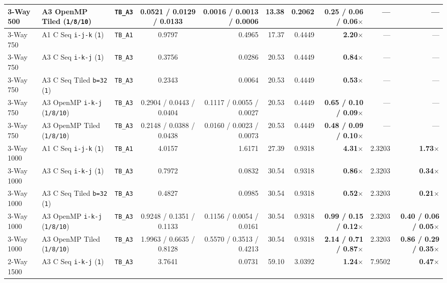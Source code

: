 \documentclass[11pt,a4paper]{article}
\begin{document}
\begin{table}[!htbp]
{\begin{tabular}{lllcrrrrrr}
3-Way 500  & A3 OpenMP Tiled (\texttt{1/8/10}) & \texttt{TB\_A3} & 0.0521 / 0.0129 / 0.0133 & 0.0016 / 0.0013 / 0.0006 & 13.38 & 0.2062 & \textbf{0.25 / 0.06 / 0.06$\times$} & --- & --- \\
\midrule
3-Way 750  & A1 C Seq \texttt{i-j-k} (\texttt{1}) & \texttt{TB\_A1} & 0.9797 & 0.4965 & 17.37 & 0.4449 & \textbf{2.20$\times$} & --- & --- \\
3-Way 750  & A3 C Seq \texttt{i-k-j} (\texttt{1}) & \texttt{TB\_A3} & 0.3756 & 0.0286 & 20.53 & 0.4449 & \textbf{0.84$\times$} & --- & --- \\
3-Way 750  & A3 C Seq Tiled \texttt{b=32} (\texttt{1}) & \texttt{TB\_A3} & 0.2343 & 0.0064 & 20.53 & 0.4449 & \textbf{0.53$\times$} & --- & --- \\
3-Way 750  & A3 OpenMP \texttt{i-k-j} (\texttt{1/8/10}) & \texttt{TB\_A3} & 0.2904 / 0.0443 / 0.0404 & 0.1117 / 0.0055 / 0.0027 & 20.53 & 0.4449 & \textbf{0.65 / 0.10 / 0.09$\times$} & --- & --- \\
3-Way 750  & A3 OpenMP Tiled (\texttt{1/8/10}) & \texttt{TB\_A3} & 0.2148 / 0.0388 / 0.0438 & 0.0160 / 0.0023 / 0.0073 & 20.53 & 0.4449 & \textbf{0.48 / 0.09 / 0.10$\times$} & --- & --- \\
\midrule
3-Way 1000 & A1 C Seq \texttt{i-j-k} (\texttt{1}) & \texttt{TB\_A1} & 4.0157 & 1.6171 & 27.39 & 0.9318 & \textbf{4.31$\times$} & 2.3203 & \textbf{1.73$\times$} \\
3-Way 1000 & A3 C Seq \texttt{i-k-j} (\texttt{1}) & \texttt{TB\_A3} & 0.7972 & 0.0832 & 30.54 & 0.9318 & \textbf{0.86$\times$} & 2.3203 & \textbf{0.34$\times$} \\
3-Way 1000 & A3 C Seq Tiled \texttt{b=32} (\texttt{1}) & \texttt{TB\_A3} & 0.4827 & 0.0985 & 30.54 & 0.9318 & \textbf{0.52$\times$} & 2.3203 & \textbf{0.21$\times$} \\
3-Way 1000 & A3 OpenMP \texttt{i-k-j} (\texttt{1/8/10}) & \texttt{TB\_A3} & 0.9248 / 0.1351 / 0.1133 & 0.1156 / 0.0054 / 0.0161 & 30.54 & 0.9318 & \textbf{0.99 / 0.15 / 0.12$\times$} & 2.3203 & \textbf{0.40 / 0.06 / 0.05$\times$} \\
3-Way 1000 & A3 OpenMP Tiled (\texttt{1/8/10}) & \texttt{TB\_A3} & 1.9963 / 0.6635 / 0.8128 & 0.5570 / 0.3513 / 0.4213 & 30.54 & 0.9318 & \textbf{2.14 / 0.71 / 0.87$\times$} & 2.3203 & \textbf{0.86 / 0.29 / 0.35$\times$} \\
\midrule
2-Way 1500 & A3 C Seq \texttt{i-k-j} (\texttt{1}) & \texttt{TB\_A3} & 3.7641 & 0.0731 & 59.10 & 3.0392 & \textbf{1.24$\times$} & 7.9502 & \textbf{0.47$\times$} \\

\end{tabular}}
\end{table}
\end{document}
